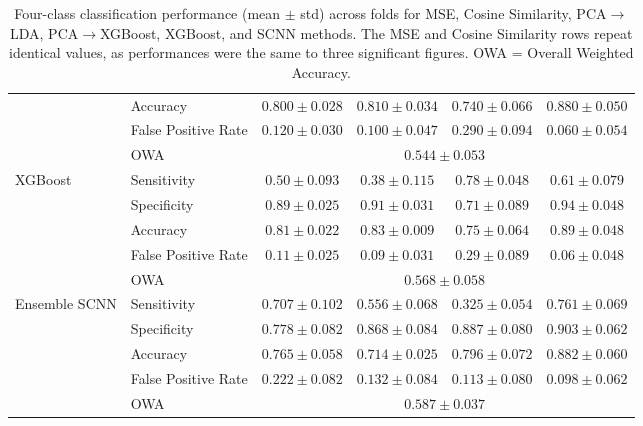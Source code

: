 \begin{table}[htbp]
\begin{tabular}{llcccc}
              & Accuracy            & $0.800\pm0.028$ & $0.810\pm0.034$ & $0.740\pm0.066$ & $0.880\pm0.050$ \\
              & False Positive Rate & $0.120\pm0.030$ & $0.100\pm0.047$ & $0.290\pm0.094$ & $0.060\pm0.054$ \\
              & OWA & \multicolumn{4}{c}{$0.544\pm0.053$} \\
\midrule
XGBoost       & Sensitivity         & $0.50\pm0.093$  & $0.38\pm0.115$  & $0.78\pm0.048$  & $0.61\pm0.079$  \\
              & Specificity         & $0.89\pm0.025$  & $0.91\pm0.031$  & $0.71\pm0.089$  & $0.94\pm0.048$  \\
              & Accuracy            & $0.81\pm0.022$  & $0.83\pm0.009$  & $0.75\pm0.064$  & $0.89\pm0.048$  \\
              & False Positive Rate & $0.11\pm0.025$  & $0.09\pm0.031$  & $0.29\pm0.089$  & $0.06\pm0.048$  \\
              & OWA & \multicolumn{4}{c}{$0.568\pm0.058$} \\
\midrule
Ensemble SCNN & Sensitivity         & $0.707\pm0.102$ & $0.556\pm0.068$ & $0.325\pm0.054$ & $0.761\pm0.069$ \\
              & Specificity         & $0.778\pm0.082$ & $0.868\pm0.084$ & $0.887\pm0.080$ & $0.903\pm0.062$ \\
              & Accuracy            & $0.765\pm0.058$ & $0.714\pm0.025$ & $0.796\pm0.072$ & $0.882\pm0.060$ \\
              & False Positive Rate & $0.222\pm0.082$ & $0.132\pm0.084$ & $0.113\pm0.080$ & $0.098\pm0.062$ \\
              & OWA & \multicolumn{4}{c}{$0.587\pm0.037$} \\
\bottomrule
\end{tabular}
\caption{Four-class classification performance (mean $\pm$ std) across folds for MSE, Cosine Similarity, PCA$\to$LDA, PCA$\to$XGBoost, XGBoost, and SCNN methods. The MSE and Cosine Similarity rows repeat identical values, as performances were the same to three significant figures. OWA = Overall Weighted Accuracy.}
\label{table:quad_results_full}
\end{table}

